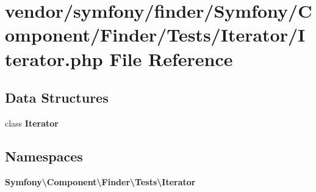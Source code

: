 \section{vendor/symfony/finder/\+Symfony/\+Component/\+Finder/\+Tests/\+Iterator/\+Iterator.php File Reference}
\label{symfony_2finder_2_symfony_2_component_2_finder_2_tests_2_iterator_2_iterator_8php}
\subsection*{Data Structures}
\begin{DoxyCompactItemize}
\item 
class {\bf Iterator}
\end{DoxyCompactItemize}
\subsection*{Namespaces}
\begin{DoxyCompactItemize}
\item 
 {\bf Symfony\textbackslash{}\+Component\textbackslash{}\+Finder\textbackslash{}\+Tests\textbackslash{}\+Iterator}
\end{DoxyCompactItemize}
